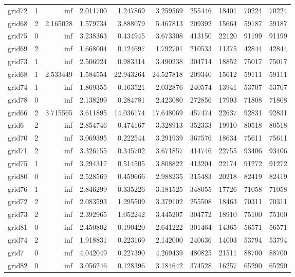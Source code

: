 \documentclass[../../../thesis.tex]{subfiles}
\begin{document}
\begin{longtable}{|l|r|r|r|r|r|r|r|r|r|}
grid72 & 1 & inf & 2.011700 & 1.247869 & 3.259569 & 255446 & 18401 & 70224 & 70224 \\
grid68 & 2 & 2.165028 & 1.579734 & 3.888079 & 5.467813 & 209392 & 15664 & 59187 & 59187 \\
grid75 & 0 & inf & 3.238363 & 0.434945 & 3.673308 & 413150 & 22120 & 91199 & 91199 \\
grid69 & 2 & inf & 1.668004 & 0.124697 & 1.792701 & 210533 & 11375 & 42844 & 42844 \\
grid73 & 1 & inf & 2.506924 & 0.983314 & 3.490238 & 304714 & 18852 & 75017 & 75017 \\
grid68 & 1 & 2.533449 & 1.584554 & 22.943264 & 24.527818 & 209340 & 15612 & 59111 & 59111 \\
grid74 & 1 & inf & 1.869355 & 0.163521 & 2.032876 & 240574 & 13941 & 53707 & 53707 \\
grid78 & 0 & inf & 2.138299 & 0.284781 & 2.423080 & 272856 & 17993 & 71808 & 71808 \\
grid66 & 2 & 3.715565 & 3.611895 & 14.036174 & 17.648069 & 457474 & 22637 & 92831 & 92831 \\
grid6 & 2 & inf & 2.854746 & 0.474167 & 3.328913 & 352333 & 19910 & 80518 & 80518 \\
grid70 & 2 & inf & 3.069395 & 0.222544 & 3.291939 & 367576 & 18634 & 75611 & 75611 \\
grid71 & 2 & inf & 3.326155 & 0.345702 & 3.671857 & 414746 & 22755 & 93406 & 93406 \\
grid75 & 1 & inf & 3.294317 & 0.514505 & 3.808822 & 413204 & 22174 & 91272 & 91272 \\
grid80 & 0 & inf & 2.528569 & 0.459666 & 2.988235 & 315483 & 20218 & 82419 & 82419 \\
grid76 & 1 & inf & 2.846299 & 0.335226 & 3.181525 & 348055 & 17726 & 71058 & 71058 \\
grid72 & 2 & inf & 2.083593 & 1.295509 & 3.379102 & 255508 & 18463 & 70311 & 70311 \\
grid73 & 2 & inf & 2.392965 & 1.052242 & 3.445207 & 304772 & 18910 & 75100 & 75100 \\
grid81 & 0 & inf & 2.450802 & 0.190420 & 2.641222 & 301464 & 14365 & 56571 & 56571 \\
grid74 & 2 & inf & 1.918831 & 0.223169 & 2.142000 & 240636 & 14003 & 53794 & 53794 \\
grid7 & 0 & inf & 4.042049 & 0.227390 & 4.269439 & 480825 & 21511 & 88700 & 88700 \\
grid82 & 0 & inf & 3.056246 & 0.128396 & 3.184642 & 374528 & 16257 & 65290 & 65290 \\

\end{longtable}
\end{document}
